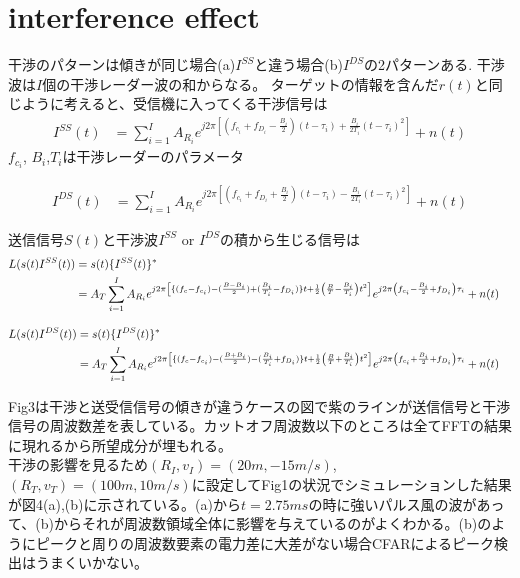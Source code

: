\section{interference effect}
干渉のパターンは傾きが同じ場合(a)$I^{SS}$と違う場合(b)$I^{DS}$の2パターンある.
干渉波は$I$個の干渉レーダー波の和からなる。
ターゲットの情報を含んだ$r(t)$と同じように考えると、受信機に入ってくる干渉信号は
\begin{align}    
    I^{S S}(t) &= \sum_{i=1}^{I} A_{R_i} e^{j2\pi\left[(f_{c_i}+f_{D_i}-\frac{B_i}{2})(t-\tau_i)+\frac{B_i}{2T_i}(t-\tau_i)^2\right]} + n(t)
\end{align}
$f_{c_i}$, $B_i$,$T_i$は干渉レーダーのパラメータ

\begin{align}
    I^{D S}(t) &= \sum_{i=1}^{I} A_{R_i} e^{j2\pi\left[(f_{c_i}+f_{D_i}+\frac{B_i}{2})(t-\tau_i)-\frac{B_i}{2T_i}(t-\tau_i)^2\right]} + n(t)
\end{align}

送信信号$S(t)$と干渉波$I^{S S}$ or $I^{D S}$の積から生じる信号は
\begin{align}
    L(s(t)I^{SS}(t)) &= s(t) \{I^{SS}(t)\}^* \cr
                     &= A_T \sum_{i=1}^{I} A_{R_i}
                     e^{j2\pi\left[\{(f_c-f_{c_i})-(\frac{B-B_i}{2})+(\frac{B_i}{T_i}-f_{D_i})\}t + \frac{1}{2}\left(\frac{B}{T}-\frac{B_i}{T_i}\right)t^2\right]}
                     e^{j2\pi\left(f_{c_i}-\frac{B_i}{2}+f_{D_i}\right)\tau_i} + n(t)
\end{align}

\begin{align}
    L(s(t)I^{DS}(t)) &= s(t) \{I^{DS}(t)\}^* \cr
                     &= A_T \sum_{i=1}^{I} A_{R_i}
                     e^{j2\pi\left[\{(f_c-f_{c_i})-(\frac{B+B_i}{2})-(\frac{B_i}{T_i}+f_{D_i})\}t + \frac{1}{2}\left(\frac{B}{T}+\frac{B_i}{T_i}\right)t^2\right]}
                     e^{j2\pi\left(f_{c_i}+\frac{B_i}{2}+f_{D_i}\right)\tau_i} + n(t)
\end{align}

Fig3は干渉と送受信信号の傾きが違うケースの図で紫のラインが送信信号と干渉信号の周波数差を表している。カットオフ周波数以下のところは全てFFTの結果に現れるから所望成分が埋もれる。\\
干渉の影響を見るため$(R_I,v_I) = (20m, -15m/s)$, $(R_T, v_T) = (100m, 10m/s)$に設定してFig1の状況でシミュレーションした結果が図4(a),(b)に示されている。(a)から$t=2.75ms$の時に強いパルス風の波があって、(b)からそれが周波数領域全体に影響を与えているのがよくわかる。(b)のようにピークと周りの周波数要素の電力差に大差がない場合CFARによるピーク検出はうまくいかない。

